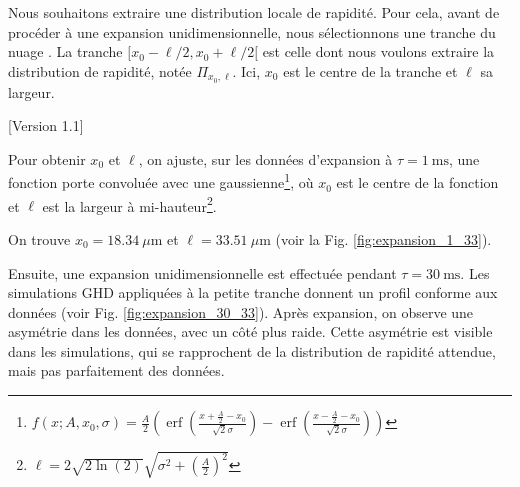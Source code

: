 \documentclass[a3, 10pt,twoside]{article}          %
\theoremstyle{plain}
\theoremstyle{definition}
\theoremstyle{remark}
\theoremstyle{definition} %
\begin{document}
Nous souhaitons extraire une distribution locale de rapidité. Pour cela, avant de procéder à une expansion unidimensionnelle, nous sélectionnons une tranche du nuage \cite{dubois_probing_2024}. La tranche $[x_0 - \ell/2, x_0 + \ell/2[$ est celle dont nous voulons extraire la distribution de rapidité, notée $\Pi_{x_0, \ell}$. Ici, $x_0$ est le centre de la tranche et $\ell$ sa largeur.

	
		
	[Version 1.1] 
	
Pour obtenir $x_0$ et $\ell$, on ajuste, sur les données d'expansion à $\tau = 1~\text{ms}$, une fonction porte convoluée avec une gaussienne\footnote{$f(x; A, x_0, \sigma) = \frac{A}{2} \left( \operatorname{erf} \left( \frac{x + \frac{A}{2} - x_0}{\sqrt{2} \sigma} \right) - \operatorname{erf} \left( \frac{x - \frac{A}{2} - x_0}{\sqrt{2} \sigma} \right) \right)$}, où $x_0$ est le centre de la fonction et $\ell$ est la largeur à mi-hauteur\footnote{$\ell = 2\sqrt{2 \ln (2)} \sqrt{\sigma^2 + \left( \frac{A}{2} \right)^2}$}. 

On trouve $x_0 = 18.34~\mu \text{m}$ et $\ell = 33.51~\mu \text{m}$ (voir la Fig. \ref{fig:expansion_1_33}).

Ensuite, une expansion unidimensionnelle est effectuée pendant $\tau = 30~\text{ms}$. Les simulations GHD appliquées à la petite tranche donnent un profil conforme aux données (voir Fig. \ref{fig:expansion_30_33}). Après expansion, on observe une asymétrie dans les données, avec un côté plus raide. Cette asymétrie est visible dans les simulations, qui se rapprochent de la distribution de rapidité attendue, mais pas parfaitement des données.
\end{document}

